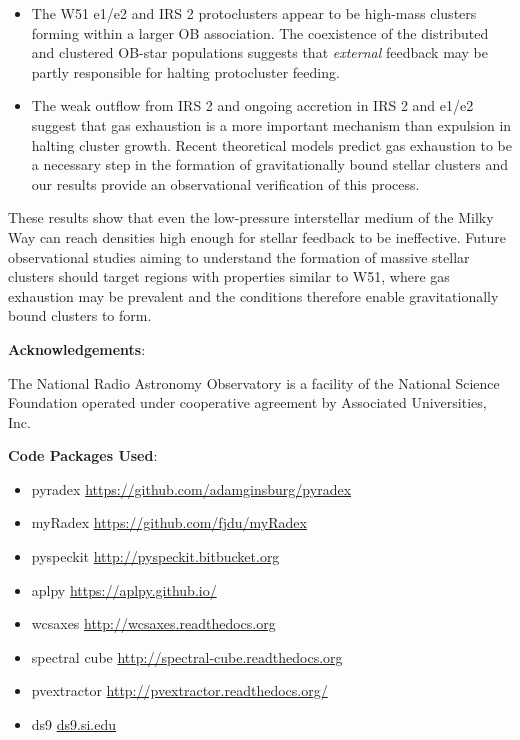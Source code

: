 \begin{itemize}
\item The W51 e1/e2 and IRS 2 protoclusters appear to be high-mass clusters
    forming within a larger OB association.  The coexistence of the distributed
    and clustered OB-star populations suggests that \emph{external} feedback
    may be partly responsible for halting protocluster feeding.

\item The weak outflow from IRS 2 and ongoing accretion in IRS 2 and e1/e2
    suggest that gas exhaustion is a more important mechanism than expulsion in
    halting cluster growth.
    Recent theoretical models predict gas exhaustion to be a necessary step in
    the formation of gravitationally bound stellar clusters
    \citep[e.g.][]{Kruijssen2012b} and our results provide an observational
    verification of this process.

\end{itemize}

These results show that even the low-pressure interstellar medium of the Milky
Way can reach densities high enough for stellar feedback to be ineffective.
Future observational studies aiming to understand the formation of massive
stellar clusters should target regions with properties similar to W51, where
gas exhaustion may be prevalent and the conditions therefore enable
gravitationally bound clusters to form.



\textbf{Acknowledgements}:

The National Radio Astronomy Observatory is a facility of the National Science
Foundation operated under cooperative agreement by Associated Universities,
Inc.

\textbf{Code Packages Used}:

\begin{itemize}
    \item pyradex \url{https://github.com/adamginsburg/pyradex}
    \item myRadex \url{https://github.com/fjdu/myRadex}
    \item pyspeckit \url{http://pyspeckit.bitbucket.org} \citet{Ginsburg2011c}
    \item aplpy \url{https://aplpy.github.io/}
    \item wcsaxes \url{http://wcsaxes.readthedocs.org}
    \item spectral cube \url{http://spectral-cube.readthedocs.org}
    \item pvextractor \url{http://pvextractor.readthedocs.org/}
    \item ds9 \url{ds9.si.edu}
\end{itemize}

